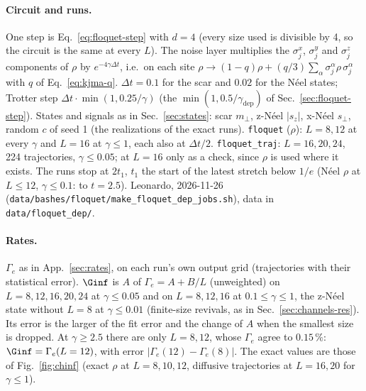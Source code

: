 \paragraph{Circuit and runs.} One step is Eq.~\eqref{eq:floquet-step} with $d = 4$ (every size used is divisible by 4, so the circuit is the same at every $L$). The noise layer multiplies the $\sigma^x_j$, $\sigma^y_j$ and $\sigma^z_j$ components of $\rho$ by $e^{-4\gamma\Delta t}$, i.e.\ on each site $\rho \to (1-q)\rho + (q/3)\sum_\alpha\sigma^\alpha_j\rho\,\sigma^\alpha_j$ with $q$ of Eq.~\eqref{eq:kjma-q}. $\Delta t = 0.1$ for the scar and $0.02$ for the Néel states; Trotter step $\Delta t\cdot\min(1, 0.25/\gamma)$ (the $\min(1, 0.5/\gamma_{\mathrm{dep}})$ of Sec.~\ref{sec:floquet-step}). States and signals as in Sec.~\ref{sec:states}: scar $m_\perp$, z-Néel $|s_z|$, x-Néel $s_\perp$, random $c$ of seed 1 (the realizations of the exact runs). \texttt{floquet} ($\rho$): $L = 8, 12$ at every $\gamma$ and $L = 16$ at $\gamma \le 1$, each also at $\Delta t/2$. \texttt{floquet\_traj}: $L = 16, 20, 24$, 224 trajectories, $\gamma \le 0.05$; at $L = 16$ only as a check, since $\rho$ is used where it exists. The runs stop at $2t_1$, $t_1$ the start of the latest stretch below $1/e$ (Néel $\rho$ at $L \le 12$, $\gamma \le 0.1$: to $t = 2.5$). Leonardo, 2026-11-26 (\texttt{data/bashes/floquet/make\_floquet\_dep\_jobs.sh}), data in \texttt{data/floquet\_dep/}.

\paragraph{Rates.} $\Gamma_e$ as in App.~\ref{sec:rates}, on each run's own output grid (trajectories with their statistical error). $\Ginf$ is $A$ of $\Gamma_e = A + B/L$ (unweighted) on $L = 8, 12, 16, 20, 24$ at $\gamma \le 0.05$ and on $L = 8, 12, 16$ at $0.1 \le \gamma \le 1$, the z-Néel state without $L = 8$ at $\gamma \le 0.01$ (finite-size revivals, as in Sec.~\ref{sec:channels-res}). Its error is the larger of the fit error and the change of $A$ when the smallest size is dropped. At $\gamma \ge 2.5$ there are only $L = 8, 12$, whose $\Gamma_e$ agree to $0.15\,\%$: $\Ginf = \Gamma_e(L = 12)$, with error $|\Gamma_e(12) - \Gamma_e(8)|$. The exact values are those of Fig.~\ref{fig:chinf} (exact $\rho$ at $L = 8, 10, 12$, diffusive trajectories at $L = 16, 20$ for $\gamma \le 1$).

